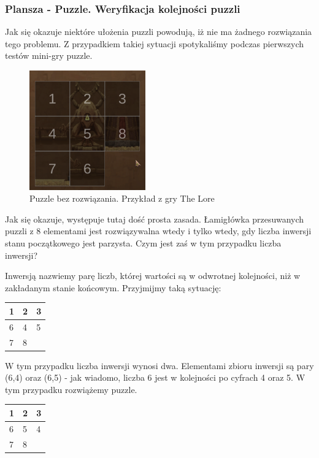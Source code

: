 \documentclass[oneside,polski,logo]{amuthesis}
\begin{document}
\subsubsection{Plansza - Puzzle. Weryfikacja kolejności puzzli}
Jak się okazuje niektóre ułożenia puzzli powodują, iż nie ma żadnego rozwiązania tego problemu. Z przypadkiem takiej sytuacji spotykaliśmy podczas pierwszych testów mini-gry puzzle. 
\begin{figure}[h]
	\centering
	\includegraphics[width=5cm]{images/tyrek/puzzle_1.png}
	\caption{Puzzle bez rozwiązania. Przykład z gry The Lore}
\end{figure}

Jak się okazuje, występuje tutaj dość prosta zasada. Łamigłówka przesuwanych puzzli z 8 elementami jest rozwiązywalna wtedy i tylko wtedy, gdy liczba inwersji stanu początkowego jest parzysta. Czym jest zaś w tym przypadku liczba inwersji?

Inwersją nazwiemy parę liczb, której wartości są w odwrotnej kolejności, niż w zakładanym stanie końcowym. \cite{solvablePuzzle} Przyjmijmy taką sytuację:

\begin{center}
\begin{tabular}{ | m{5em} | m{1cm}| m{1cm} | } 
\hline
 1 & 2 & 3 \\ 
\hline
 6 & 4 & 5 \\
\hline  
 7 & 8 &     \\
\hline
\end{tabular}
\end{center}

W tym przypadku liczba inwersji wynosi dwa. Elementami zbioru inwersji są pary (6,4) oraz (6,5) - jak wiadomo, liczba 6 jest w kolejności po cyfrach 4 oraz 5. W tym przypadku rozwiążemy puzzle.

\begin{center}
\begin{tabular}{ | m{5em} | m{1cm}| m{1cm} | } 
\hline
 1 & 2 & 3 \\ 
\hline
 6 & 5 & 4 \\  
\hline
 7 & 8 &     \\
\hline
\end{tabular}
\end{center}
\end{document}
